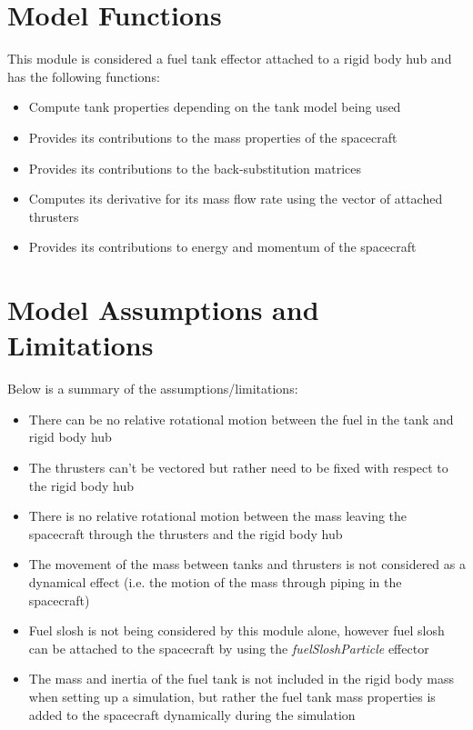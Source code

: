\section{Model Functions}

This module is considered a fuel tank effector attached to a rigid body hub and has the following functions:

\begin{itemize}
	\item Compute tank properties depending on the tank model being used
	\item Provides its contributions to the mass properties of the spacecraft 
	\item Provides its contributions to the back-substitution matrices
	\item Computes its derivative for its mass flow rate using the vector of attached thrusters
	\item Provides its contributions to energy and momentum of the spacecraft
\end{itemize}

\section{Model Assumptions and Limitations}
Below is a summary of the assumptions/limitations:

\begin{itemize}
	\item There can be no relative rotational motion between the fuel in the tank and rigid body hub 
	\item The thrusters can't be vectored but rather need to be fixed with respect to the rigid body hub
	\item There is no relative rotational motion between the mass leaving the spacecraft through the thrusters and the rigid body hub
	\item The movement of the mass between tanks and thrusters is not considered as a dynamical effect (i.e. the motion of the mass through piping in the spacecraft)
	\item Fuel slosh is not being considered by this module alone, however fuel slosh can be attached to the spacecraft by using the \textit{fuelSloshParticle} effector
	\item The mass and inertia of the fuel tank is not included in the rigid body mass when setting up a simulation, but rather the fuel tank mass properties is added to the spacecraft dynamically during the simulation
\end{itemize}